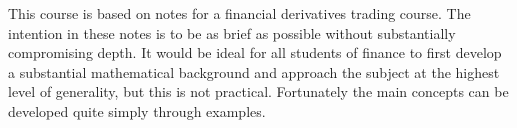 This course is based on notes for a financial derivatives trading course. The intention in these notes is to be as brief as possible without substantially compromising depth. It would be ideal for all students of finance to first develop a substantial mathematical background and approach the subject at the highest level of generality, but this is not practical. Fortunately the main concepts can be developed quite simply through examples.

